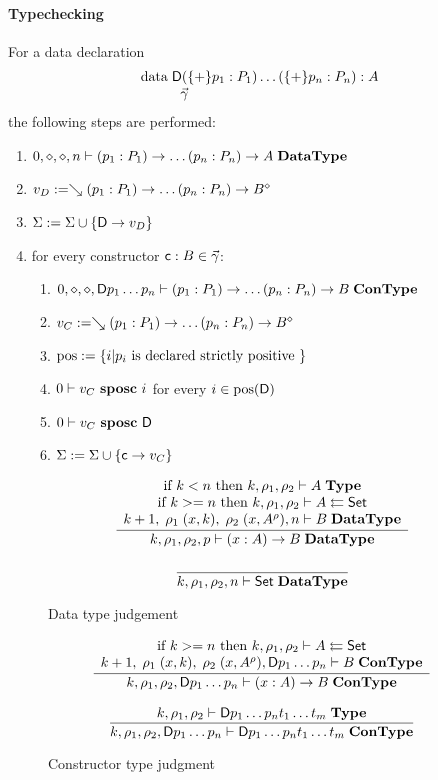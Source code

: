 \paragraph*{Typechecking}
For a data declaration  
\[\begin{array}{l}
\data \DD (\{+\} p_1 : P_1) \ldots (\{+\} p_n : P_n) : A \\
\spcx \vec{\gamma}
\end{array}
\]
the following steps are performed:
\begin{enumerate}
\item
$0,\diamond,\diamond,n\vdash(p_1 : P_1) \rightarrow \ldots (p_n : P_n) \rightarrow A\;\mathbf{DataType}$
\item
$v_D := \searrow (p_1 : P_1) \rightarrow \ldots (p_n : P_n) \rightarrow B^{\diamond}$
\item
$\mathrm{\Sigma} := \mathrm{\Sigma} \cup \{\mathsf{D} \rightarrow v_D\}$
\item
for every constructor $\mathsf{c} : B  \in \vec{\gamma}$:
\begin{enumerate} 
\item
$0,\diamond,\diamond,\mathsf{D} p_1 \ldots p_n\vdash(p_1 : P_1) \rightarrow \ldots (p_n : P_n) \rightarrow B\;\mathbf{ConType}$
\item
$v_C := \searrow (p_1 : P_1) \rightarrow \ldots (p_n : P_n) \rightarrow B^{\diamond}$
\item
$\mbox{pos} := \{ i | p_i \mbox{ is declared strictly positive } \} $ 
\item
$0\vdash v_C\mbox{ \textbf{sposc} }i$ for every $i \in \mbox{pos}(\mathsf{D}) $ 
\item
$0\vdash v_C\mbox{ \textbf{sposc} }\mathsf{D}$
\item
$\mathrm{\Sigma} := \mathrm{\Sigma} \cup \{\mathsf{c} \rightarrow v_C\}$
\end{enumerate}
\end{enumerate}

\newcommand{\nocc}[3]{#1\vdash#2\mbox{ \textbf{nocc} }#3}

\begin{figure}
\begin{gather*}
\ \dfrac{\begin{array}[b]{c}\mbox {if } k < n \mbox{ then } k,\rho_1,\rho_2\vdash A\;\mathbf{Type}\\\mbox {if } k >= n \mbox { then } k,\rho_1,\rho_2\vdash A\leftleftarrows\mathsf{Set}\\k+1, \; \rho_1 \; (x,k), \; \rho_2 \; (x,A^{\rho}),n\vdash B\;\mathbf{DataType}\end{array}}{k,\rho_1,\rho_2,p\vdash( x : A ) \rightarrow{B}\;\mathbf{DataType}}
\\[2ex]
\ \dfrac{}{k,\rho_1,\rho_2,n\vdash\mathsf{Set}\;\mathbf{DataType}}
\end{gather*}
\caption{Data type judgement}
\end{figure}

\begin{figure}
\begin{gather*}
\ \dfrac{\begin{array}[b]{c}\mbox {if } k >= n \mbox { then } k,\rho_1,\rho_2\vdash A\leftleftarrows\mathsf{Set}\\k+1, \; \rho_1 \; (x,k), \; \rho_2 \; (x,A^{\rho}),\mathsf{D} p_1 \ldots p_n\vdash B\;\mathbf{ConType}\end{array}}{k,\rho_1,\rho_2,\mathsf{D} p_1 \ldots p_n\vdash( x : A ) \rightarrow{B}\;\mathbf{ConType}}
\\[2ex]
\ \dfrac{k,\rho_1,\rho_2\vdash\mathsf{D} p_1 \ldots p_n t_1 \ldots t_m\;\mathbf{Type}}{k,\rho_1,\rho_2,\mathsf{D} p_1 \ldots p_n\vdash\mathsf{D} p_1 \ldots p_n t_1 \ldots t_m\;\mathbf{ConType}}
\end{gather*}
\caption{Constructor type judgment}
\end{figure}


